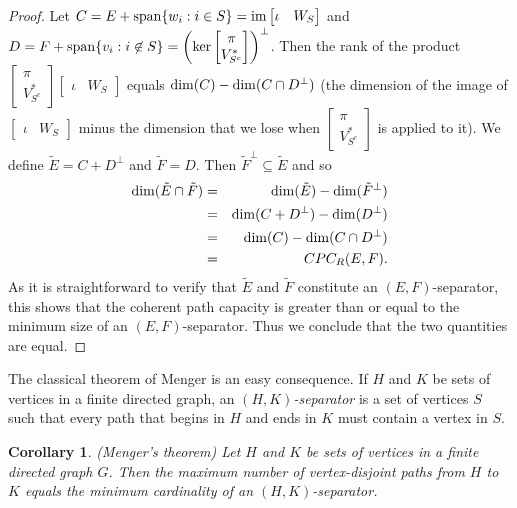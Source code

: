 \documentclass{amsart}
\newtheorem{cor}[thm]{Corollary}
\theoremstyle{definition}
\begin{document}
\begin{proof}
Let $C = E + {\rm span}\{w_i: i \in S\} = {\rm im}\left[\begin{matrix}\iota & W_S\end{matrix}\right]$ and $D = F + {\rm span}
\{v_i: i \not\in S\} = \left({\rm ker}\left[\begin{matrix}\pi\\ V_{S^c}^*\end{matrix}\right]\right)^\perp$. Then the rank of the product $\left[\begin{matrix}\pi\\ V_{S^c}^*\end{matrix}\right]\left[\begin{matrix}\iota & W_S\end{matrix}\right]$ equals ${\rm dim}(C) - {\rm dim}(C \cap D^\perp)$ (the dimension of the image of $\left[\begin{matrix}\iota & W_S\end{matrix}\right]$ minus the dimension that we lose when $\left[\begin{matrix}\pi\\ V_{S^c}^*\end{matrix}\right]$ is applied to it). We define $\tilde{E} = C + D^\perp$ and $\tilde{F} = D$. Then $\tilde{F}^\perp \subseteq \tilde{E}$ and so \begin{eqnarray*}{\rm dim}(\tilde{E} \cap \tilde{F}) &=& {\rm dim}(\tilde{E}) - {\rm dim}(\tilde{F}^\perp)\\ &=& {\rm dim}(C + D^\perp) - {\rm dim}(D^\perp)\\ &=&{\rm dim}(C) - {\rm dim}(C \cap D^\perp)\\ &=& CPC_R(E,F).\end{eqnarray*} As it is straightforward to verify that $\tilde{E}$ and $\tilde{F}$ constitute an $(E,F)$-separator, this shows that the coherent path capacity is greater than or equal to the minimum size of an $(E,F)$-separator. Thus we conclude that the two quantities are equal.
\end{proof}

The classical theorem of Menger is an easy consequence. If $H$ and $K$ be sets of vertices in a finite directed graph, an {\it $(H,K)$-separator} is a set of vertices $S$ such that every path that begins in $H$ and ends in $K$ must contain a vertex in $S$.

\begin{cor} (Menger's theorem)
Let $H$ and $K$ be sets of vertices in a finite directed graph $G$. Then the maximum number of vertex-disjoint paths from $H$ to $K$ equals the minimum cardinality of an $(H,K)$-separator.
\end{cor}
\end{document}
